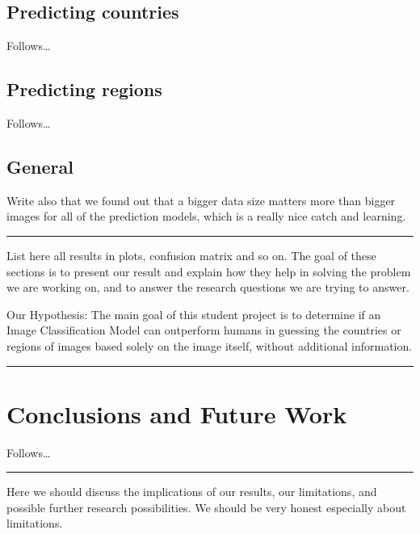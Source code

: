 \subsection{Predicting countries}\label{predicting-countries}

Follows\ldots{}

\subsection{Predicting regions}\label{predicting-regions}

Follows\ldots{}

\subsection{General}\label{general}

Write also that we found out that a bigger data size matters more than
bigger images for all of the prediction models, which is a really nice
catch and learning.

\begin{center}\rule{0.5\linewidth}{0.5pt}\end{center}

List here all results in plots, confusion matrix and so on. The goal of
these sections is to present our result and explain how they help in
solving the problem we are working on, and to answer the research
questions we are trying to answer.

Our Hypothesis: The main goal of this student project is to determine if
an Image Classification Model can outperform humans in guessing the
countries or regions of images based solely on the image itself, without
additional information.

\begin{center}\rule{0.5\linewidth}{0.5pt}\end{center}

\section{Conclusions and Future Work}\label{conclusions-and-future-work}

Follows\ldots{}

\begin{center}\rule{0.5\linewidth}{0.5pt}\end{center}

Here we should discuss the implications of our results, our limitations,
and possible further research possibilities. We should be very honest
especially about limitations.

